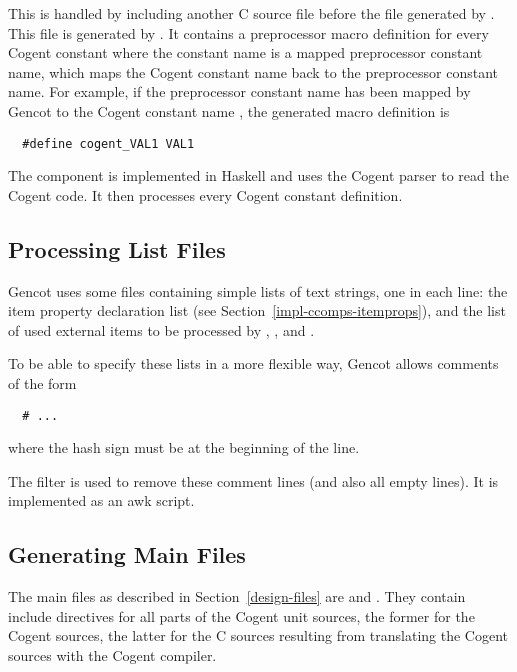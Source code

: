 This is handled by including another C source file before the file generated by . This
file is generated by . It contains a preprocessor macro definition for every Cogent constant
where the constant name is a mapped preprocessor constant name, which maps the Cogent constant name back to 
the preprocessor constant name. For example, if the preprocessor constant name  has been mapped by
Gencot to the Cogent constant name , the generated macro definition is
\begin{verbatim}
  #define cogent_VAL1 VAL1
\end{verbatim}

The component  is implemented in Haskell and uses the Cogent parser to read the Cogent code.
It then processes every Cogent constant definition.

\subsection{Processing List Files}
\label{impl-ocomps-prclist}

Gencot uses some files containing simple lists of text strings, one in each line: the item property declaration list (see 
Section~\ref{impl-ccomps-itemprops}), and the list of used external items to be processed by , 
, and .

To be able to specify these lists in a more flexible way, Gencot allows comments of the form
\begin{verbatim}
  # ...
\end{verbatim}
where the hash sign must be at the beginning of the line.

The filter  is used to remove these comment lines (and also all empty lines). It is implemented
as an awk script.

\subsection{Generating Main Files}
\label{impl-ocomps-main}

The main files as described in Section~\ref{design-files} are  and . They
contain include directives for all parts of the Cogent unit sources, the former for the Cogent sources, the latter 
for the C sources resulting from translating the Cogent sources with the Cogent compiler.

